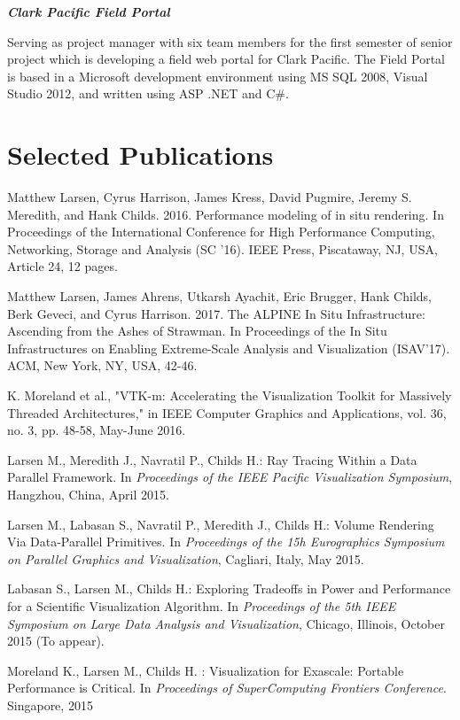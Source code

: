 \documentclass[margin,line]{res}
\begin{document}
\begin{resume}
{\em \textbf{Clark Pacific Field Portal } }

\vspace{-.4cm}
Serving as project manager with six team members for the first semester of senior project which is developing a field web portal for Clark Pacific. The Field Portal is based in a Microsoft development environment using MS SQL 2008, Visual Studio 2012, and written using ASP .NET and C\#. 

\section{\sc Selected Publications}

Matthew Larsen, Cyrus Harrison, James Kress, David Pugmire, Jeremy S. Meredith, and Hank Childs. 2016. Performance modeling of in situ rendering. In Proceedings of the International Conference for High Performance Computing, Networking, Storage and Analysis (SC '16). IEEE Press, Piscataway, NJ, USA, Article 24, 12 pages.

Matthew Larsen, James Ahrens, Utkarsh Ayachit, Eric Brugger, Hank Childs, Berk Geveci, and Cyrus Harrison. 2017. The ALPINE In Situ Infrastructure: Ascending from the Ashes of Strawman. In Proceedings of the In Situ Infrastructures on Enabling Extreme-Scale Analysis and Visualization (ISAV'17). ACM, New York, NY, USA, 42-46.

K. Moreland et al., "VTK-m: Accelerating the Visualization Toolkit for Massively Threaded Architectures," in IEEE Computer Graphics and Applications, vol. 36, no. 3, pp. 48-58, May-June 2016.

Larsen M., Meredith J., Navratil P., Childs H.: Ray Tracing Within a Data Parallel Framework. In \textit{Proceedings of the IEEE Pacific Visualization Symposium}, Hangzhou, China, April 2015.
     
Larsen M., Labasan S., Navratil P., Meredith J., Childs H.: Volume Rendering Via Data-Parallel Primitives. In \textit{Proceedings of the 15h Eurographics Symposium on Parallel Graphics and Visualization}, Cagliari, Italy, May 2015.

Labasan S., Larsen M., Childs H.: Exploring Tradeoffs in Power and Performance for a Scientific Visualization Algorithm. In \textit{Proceedings of the 5th IEEE Symposium on Large Data Analysis and Visualization}, Chicago, Illinois, October 2015 (To appear).

Moreland K., Larsen M., Childs H. : Visualization for Exascale: Portable Performance is Critical. In \textit{Proceedings of SuperComputing Frontiers Conference}. Singapore, 2015


\end{resume}
\end{document}
